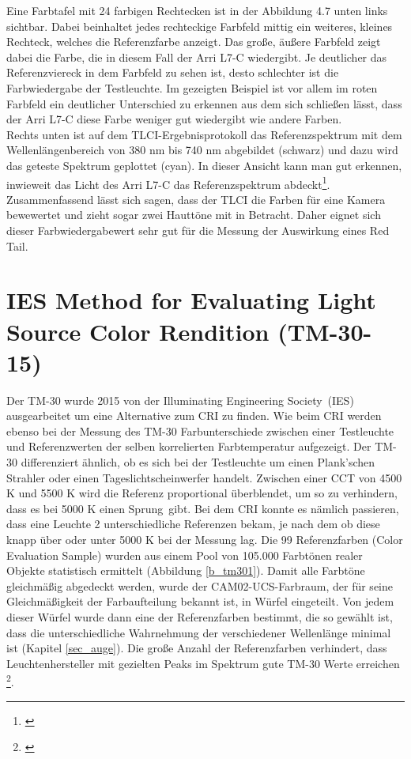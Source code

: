 Eine Farbtafel mit 24 farbigen Rechtecken ist in der Abbildung 4.7 unten links sichtbar. Dabei beinhaltet jedes rechteckige Farbfeld mittig ein weiteres, kleines Rechteck, welches die Referenzfarbe anzeigt. Das große, äußere Farbfeld zeigt dabei die Farbe, die in diesem Fall der Arri L7-C wiedergibt. Je deutlicher das Referenzviereck in dem Farbfeld zu sehen ist, desto schlechter ist die Farbwiedergabe der Testleuchte. Im gezeigten Beispiel ist vor allem im roten Farbfeld ein deutlicher Unterschied zu erkennen aus dem sich schließen lässt, dass der Arri L7-C diese Farbe weniger gut wiedergibt wie andere Farben.\\ 
Rechts unten ist auf dem TLCI-Ergebnisprotokoll das Referenzspektrum mit dem Wellenlängenbereich von 380 nm bis 740 nm abgebildet (schwarz) und dazu wird das geteste Spektrum geplottet (cyan). In dieser Ansicht kann man gut erkennen, inwieweit das Licht des Arri L7-C das Referenzspektrum abdeckt\footnote{\cite[15]{roberts}}.\\

Zusammenfassend lässt sich sagen, dass der TLCI die Farben für eine Kamera bewewertet und zieht sogar zwei Hauttöne mit in Betracht. Daher eignet sich dieser Farbwiedergabewert sehr gut für die Messung der Auswirkung eines Red Tail.  



\section{IES Method for Evaluating Light Source Color Rendition (TM-30-15)} \label{sec_tm30}

Der TM-30 wurde 2015 von der \glqq Illuminating Engineering Society\grqq\ (IES) ausgearbeitet um eine Alternative zum CRI zu finden. Wie beim CRI werden ebenso bei der Messung des TM-30 Farbunterschiede zwischen einer Testleuchte und Referenzwerten der selben korrelierten Farbtemperatur aufgezeigt. Der TM-30 differenziert ähnlich, ob es sich bei der Testleuchte um einen Plank'schen Strahler oder einen Tageslichtscheinwerfer handelt. Zwischen einer CCT von 4500 K und 5500 K wird die Referenz proportional überblendet, um so zu verhindern, dass es bei 5000 K einen \glqq Sprung\grqq\ gibt. Bei dem CRI konnte es nämlich passieren, dass eine Leuchte 2 unterschiedliche Referenzen bekam, je nach dem ob diese knapp über oder unter 5000 K bei der Messung lag. 
Die 99 Referenzfarben (Color Evaluation Sample) wurden aus einem Pool von 105.000 Farbtönen realer Objekte statistisch ermittelt (Abbildung \ref{b_tm301}). Damit alle Farbtöne gleichmäßig abgedeckt werden, wurde der CAM02-UCS-Farbraum, der für seine Gleichmäßigkeit der Farbaufteilung bekannt ist, in Würfel eingeteilt. Von jedem dieser Würfel wurde dann eine der Referenzfarben bestimmt, die so gewählt ist, dass die unterschiedliche Wahrnehmung der verschiedener Wellenlänge minimal ist (Kapitel \ref{sec_auge}). Die große Anzahl der Referenzfarben verhindert, dass Leuchtenhersteller mit gezielten Peaks im Spektrum gute TM-30 Werte erreichen \footnote{\cite{usdep}}.
\newpage

